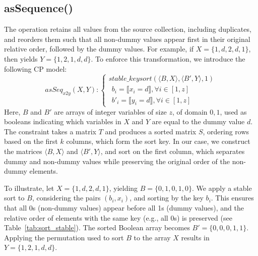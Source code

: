\subsection{asSequence()}
\smallskip
\noindent
\label{ssec:asSeq}
The  operation retains all values from the source collection, including duplicates, and reorders them such that all non-dummy values appear first in their original relative order, followed by the dummy values.
For example, if $X = \{1, d, 2, d, 1\}$, then  yields $Y = \{1, 2, 1, d, d\}$. To enforce this transformation, we introduce the following CP model: 
\begin{equation}\label{csp:seq_X2Y}
asSeq_{x2y}(X,Y) :
\begin{cases}
stable\_keysort(\langle B,X\rangle,\langle B',Y\rangle,1) \\
~~b_i=\llbracket x_i=d \rrbracket, \forall i \in [1,z] \\
~~b'_i=\llbracket y_i=d \rrbracket, \forall i \in [1,z]
\end{cases}
\end{equation}
Here, $B$ and $B'$ are arrays of integer variables of size $z$, of domain ${0,1}$, used as booleans indicating which variables in $X$ and $Y$ are equal to the dummy value $d$. The  constraint takes a matrix $T$ and produces a sorted matrix $S$, ordering rows based on the first $k$ columns, which form the sort key. In our case, we construct the matrices $\langle B, X \rangle$ and $\langle B', Y \rangle$, and sort on the first column, which separates dummy and non-dummy values while preserving the original order of the non-dummy elements. 

To illustrate, let $X = \{1, d, 2, d, 1\}$, yielding $B = \{0, 1, 0, 1, 0\}$. We apply a stable sort to $B$, considering the pairs $(b_i,x_i)$, and sorting by the key $b_i$. 
This ensures that all 0s (non-dummy values) appear before all 1s (dummy values), and the relative order of elements with the same key (e.g., all 0s) is preserved (see Table~\ref{tab:sort_stable}). The sorted Boolean array becomes $B' = \{0, 0, 0, 1, 1\}$. Applying the permutation used to sort $B$ to the array $X$ results in $Y = \{1, 2, 1, d, d\}$.


